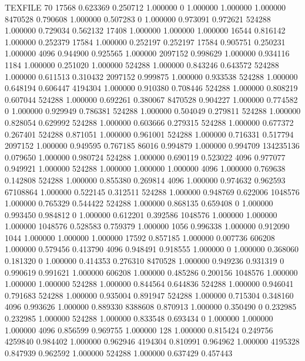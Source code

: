 TEXFILE
70
17568 0.623369 0.250712 1.000000
0 1.000000 1.000000 1.000000
8470528 0.790608 1.000000 0.507283
0 1.000000 0.973091 0.972621
524288 1.000000 0.729034 0.562132
17408 1.000000 1.000000 1.000000
16544 0.816142 1.000000 0.252379
17584 1.000000 0.252197 0.252197
17584 0.905751 0.250231 1.000000
4096 0.944900 0.925565 1.000000
2097152 0.998629 1.000000 0.934116
1184 1.000000 0.251020 1.000000
524288 1.000000 0.843246 0.643572
524288 1.000000 0.611513 0.310432
2097152 0.999875 1.000000 0.933538
524288 1.000000 0.648194 0.606447
4194304 1.000000 0.910380 0.708446
524288 1.000000 0.808219 0.607044
524288 1.000000 0.692261 0.380067
8470528 0.904227 1.000000 0.774582
0 1.000000 0.929949 0.786381
524288 1.000000 0.504049 0.279811
524288 1.000000 0.828054 0.629992
524288 1.000000 0.603666 0.279315
524288 1.000000 0.677372 0.267401
524288 0.871051 1.000000 0.961001
524288 1.000000 0.716331 0.517794
2097152 1.000000 0.949595 0.767185
86016 0.994879 1.000000 0.994709
134235136 0.079650 1.000000 0.980724
524288 1.000000 0.690119 0.523022
4096 0.977077 0.949921 1.000000
524288 1.000000 1.000000 1.000000
4096 1.000000 0.769638 0.142808
524288 1.000000 0.855380 0.269814
4096 1.000000 0.974632 0.962593
67108864 1.000000 0.522145 0.312511
524288 1.000000 0.948769 0.622006
1048576 1.000000 0.765329 0.544422
524288 1.000000 0.868135 0.659408
0 1.000000 0.993450 0.984812
0 1.000000 0.612201 0.392586
1048576 1.000000 1.000000 1.000000
1048576 0.528583 0.759379 1.000000
1056 0.996338 1.000000 0.912090
1044 1.000000 1.000000 1.000000
17592 0.857185 1.000000 0.007736
606208 1.000000 0.579456 0.413790
4096 0.948491 0.918555 1.000000
0 1.000000 0.368060 0.181320
0 1.000000 0.414353 0.276310
8470528 1.000000 0.949236 0.931319
0 0.990619 0.991621 1.000000
606208 1.000000 0.485286 0.200156
1048576 1.000000 1.000000 1.000000
524288 1.000000 0.844564 0.644836
524288 1.000000 0.946041 0.791683
524288 1.000000 0.935004 0.891947
524288 1.000000 0.715304 0.348160
4096 0.993626 1.000000 0.889330
8388608 0.870913 1.000000 0.350490
0 0.232985 0.232985 1.000000
524288 1.000000 0.833548 0.693434
0 1.000000 1.000000 1.000000
4096 0.856599 0.969755 1.000000
128 1.000000 0.815424 0.249756
4259840 0.984402 1.000000 0.962946
4194304 0.810991 0.964962 1.000000
4195328 0.847939 0.962592 1.000000
524288 1.000000 0.637429 0.457443